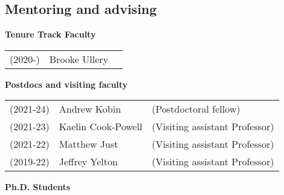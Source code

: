 \documentclass[margin,line]{res}
\newcommand{\defi}[1]{\textsf{#1}} 				%
\begin{document}
\begin{resume}


\section{\sc Mentoring and advising}



{\bf Tenure Track Faculty}
\vspace*{-.1in}

\begin{tabular}{lll}
  (2020-) & \defi{Brooke Ullery} & 
\end{tabular}

{\bf Postdocs and visiting faculty}
\vspace*{-.1in}

\begin{tabular}{lll}
  (2021-24) & \defi{Andrew Kobin} & (Postdoctoral fellow)
    \vspace{4pt}\\
  (2021-23) & \defi{Kaelin Cook-Powell} & (Visiting assistant Professor)
    \vspace{4pt}\\    
  (2021-22) & \defi{Matthew Just} & (Visiting assistant Professor)
    \vspace{4pt}\\  
  (2019-22) & \defi{Jeffrey Yelton} & (Visiting assistant Professor)
    \vspace{4pt}\\
\end{tabular}

{\bf Ph.D. Students}
\vspace*{-.1in}


\end{resume}
\end{document}
